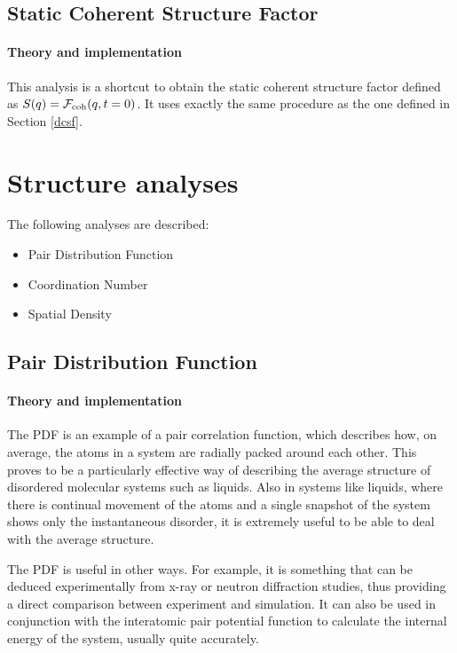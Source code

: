 \documentclass[a4paper,11pt]{article}
\begin{document}
\subsection{Static Coherent Structure Factor}
\label{scsf}
\paragraph{Theory and implementation\\}
\label{scsf_theory}
This analysis is a shortcut to obtain the static coherent structure factor defined as
$S(q) = {\cal F}_{\mathrm{coh}}(q, t = 0)$. It uses exactly the same procedure as the one defined in Section \ref{dcsf}.

\section{Structure analyses}
\label{structure_menu}
The following analyses are described:
\begin{itemize}
\item Pair Distribution Function
\item Coordination Number
\item Spatial Density
\end{itemize}

\subsection{Pair Distribution Function}
\label{pdf}
\paragraph{Theory and implementation\\}
\label{pdf_theory}
The \gls{PDF} is an example of a pair correlation function, which describes how, on average,
the atoms in a system are radially packed around each other. This proves to be a particularly effective way of describing
the average structure of disordered molecular systems such as liquids. Also in systems like liquids, where there is
continual movement of the atoms and a single snapshot of the system shows only the instantaneous disorder, it is extremely
useful to be able to deal with the average structure.

The \gls{PDF} is useful in other ways. For example, it is something that can be deduced experimentally from x-ray or neutron
diffraction studies, thus providing a direct comparison between experiment and simulation. It can also be used in
conjunction with the interatomic pair potential function to calculate the internal energy of the system, usually quite
accurately.
\end{document}
